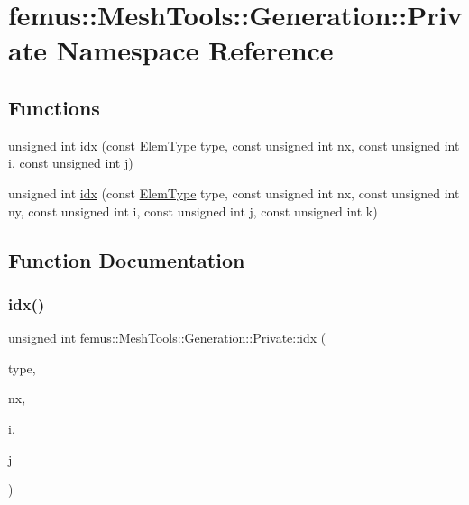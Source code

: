 \hypertarget{namespacefemus_1_1_mesh_tools_1_1_generation_1_1_private}{}\section{femus\+:\+:Mesh\+Tools\+:\+:Generation\+:\+:Private Namespace Reference}
\label{namespacefemus_1_1_mesh_tools_1_1_generation_1_1_private}
\subsection*{Functions}
\begin{DoxyCompactItemize}
\item 
unsigned int \mbox{\hyperlink{namespacefemus_1_1_mesh_tools_1_1_generation_1_1_private_aaf3a90632b9ae7f97dc126807a304603}{idx}} (const \mbox{\hyperlink{_elem_type_enum_8hpp_a1b014294b9757a001707c979e2bab627}{Elem\+Type}} type, const unsigned int nx, const unsigned int i, const unsigned int j)
\item 
unsigned int \mbox{\hyperlink{namespacefemus_1_1_mesh_tools_1_1_generation_1_1_private_a427a9bc92a94349eb97bb891a9434ee8}{idx}} (const \mbox{\hyperlink{_elem_type_enum_8hpp_a1b014294b9757a001707c979e2bab627}{Elem\+Type}} type, const unsigned int nx, const unsigned int ny, const unsigned int i, const unsigned int j, const unsigned int k)
\end{DoxyCompactItemize}


\subsection{Function Documentation}
\mbox{\label{namespacefemus_1_1_mesh_tools_1_1_generation_1_1_private_aaf3a90632b9ae7f97dc126807a304603}} 
\subsubsection{\texorpdfstring{idx()}{idx()}\hspace{0.1cm}{\footnotesize\ttfamily [1/2]}}
{\footnotesize\ttfamily unsigned int femus\+::\+Mesh\+Tools\+::\+Generation\+::\+Private\+::idx (\begin{DoxyParamCaption}\item[{const \mbox{\hyperlink{_elem_type_enum_8hpp_a1b014294b9757a001707c979e2bab627}{Elem\+Type}}}]{type,  }\item[{const unsigned int}]{nx,  }\item[{const unsigned int}]{i,  }\item[{const unsigned int}]{j }\end{DoxyParamCaption})\hspace{0.3cm}{\ttfamily [inline]}}

